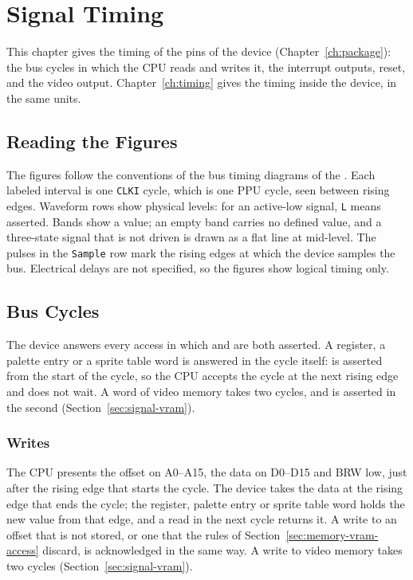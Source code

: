 \chapter{Signal Timing}
\label{ch:signal-timing}

This chapter gives the timing of the pins of the device (Chapter~\ref{ch:package}): the bus cycles in which the CPU
reads and writes it, the interrupt outputs, reset, and the video output. Chapter~\ref{ch:timing} gives the timing
inside the device, in the same units.

\section{Reading the Figures}

The figures follow the conventions of the bus timing diagrams of the \hwmanual{}. Each labeled interval is one
\texttt{CLKI} cycle, which is one PPU cycle, seen between rising edges. Waveform rows show physical levels: for an
active-low signal, \texttt{L} means asserted. Bands show a value; an empty band carries no defined value, and a
three-state signal that is not driven is drawn as a flat line at mid-level. The pulses in the \texttt{Sample} row mark
the rising edges at which the device samples the bus. Electrical delays are not specified, so the figures show logical
timing only.

\section{Bus Cycles}
\label{sec:signal-bus}

The device answers every access in which  and  are both asserted. A register, a palette
entry or a sprite table word is answered in the cycle itself:  is asserted from the start of the cycle,
so the CPU accepts the cycle at the next rising edge and does not wait. A word of video memory takes two cycles, and
 is asserted in the second (Section~\ref{sec:signal-vram}).

\subsection{Writes}

The CPU presents the offset on A0--A15, the data on D0--D15 and BRW low, just after the rising edge that starts the
cycle. The device takes the data at the rising edge that ends the cycle; the register, palette entry or sprite table
word holds the new value from that edge, and a read in the next cycle returns it. A write to an offset that is not
stored, or one that the rules of Section~\ref{sec:memory-vram-access} discard, is acknowledged in the same way. A write
to video memory takes two cycles (Section~\ref{sec:signal-vram}).

